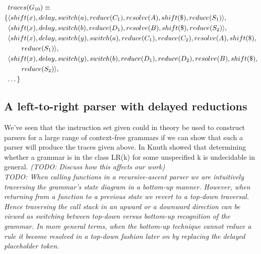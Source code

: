 \documentclass[11pt]{article}
\begin{document}
\parbox{.3\textwidth}{\begin{align*}
&traces(G_{10}) \equiv \\
 \{ & \langle shift(x), delay, switch(a), reduce(C_1), resolve(A), shift(\$), reduce(S_1) \rangle,\\
    & \langle shift(x), delay, switch(b), reduce(D_1), resolve(B), shift(\$), reduce(S_2) \rangle,\\
    & \langle shift(x), delay, switch(y), switch(a), reduce(C_1), reduce(C_2), resolve(A), shift(\$), \\&\qquad reduce(S_1) \rangle,\\
    & \langle shift(x), delay, switch(y), switch(b), reduce(D_1), reduce(D_2), resolve(B), shift(\$), \\&\qquad reduce(S_2) \rangle,\\
    & \textellipsis \}
\end{align*}}


\subsection{A left-to-right parser with delayed reductions}
We've seen that the instruction set given could in theory be used to construct parsers for a large range of context-free grammars if we can show that such a parser will produce the traces given above.
In \cite{knuth65} Knuth showed that determining whether a grammar is in the class LR(k) for some unspecified k is undecidable in general. \emph{ (TODO: Discuss how this affects our work) }\\

\emph{TODO:
When calling functions in a recursive-ascent parser we are intuitively traversing the grammar's state diagram in a bottom-up manner.
However, when returning from a function to a previous state we revert to a top-down traversal.
Hence traversing the call stack in an upward or a downward direction can be viewed as switching between top-down versus bottom-up recognition of the grammar. 
In more general terms, when the bottom-up technique cannot reduce a rule it become resolved in a top-down fashion later on by replacing the delayed placeholder token.}
\end{document}
